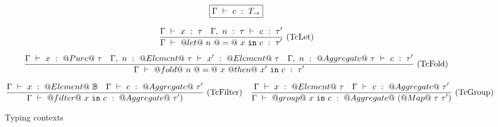 \begin{figure*}

$$
\boxed{\Gamma ~\vdash~ c ~:~ T_\to}
$$


$$
\frac {\displaystyle 
    \Gamma ~\vdash~ x ~:~ \tau
    \quad
    \Gamma,~n~:~\tau ~\vdash~ c ~:~ \tau'
} {\displaystyle 
    \Gamma ~\vdash~ @let@~n~@=@~x~\mathtt{in}~c ~:~ \tau'
} \ 
\textrm{(TcLet)}
$$

$$
\frac {\displaystyle 
    \Gamma ~\vdash~ x ~:~ @Pure@~\tau
    \quad
    \Gamma,~n~:~@Element@~\tau ~\vdash~ x' ~:~ @Element@~\tau
    \quad
    \Gamma,~n~:~@Aggregate@~\tau ~\vdash~ c ~:~ \tau'
} {\displaystyle 
    \Gamma ~\vdash~ @fold@~n~@=@~x~@then@~x'~\mathtt{in}~c ~:~ \tau'
} \ 
\textrm{(TcFold)}
$$

$$
\frac {\displaystyle 
    \Gamma ~\vdash~ x ~:~ @Element@~\mathbb{B}
    \quad
    \Gamma ~\vdash~ c ~:~ @Aggregate@~\tau'
} {\displaystyle 
    \Gamma ~\vdash~ @filter@~x~\mathtt{in}~c ~:~ @Aggregate@~\tau')
} \ 
\textrm{(TcFilter)}
\quad
\frac {\displaystyle 
    \Gamma ~\vdash~ x ~:~ @Element@~\tau
    \quad
    \Gamma ~\vdash~ c ~:~ @Aggregate@~\tau'
} {\displaystyle 
    \Gamma ~\vdash~ @group@~x~\mathtt{in}~c ~:~ @Aggregate@~(@Map@~\tau~\tau')
} \ 
\textrm{(TcGroup)}
$$



\caption{Typing contexts}
\label{fig:source:type:ctx}
\end{figure*}

